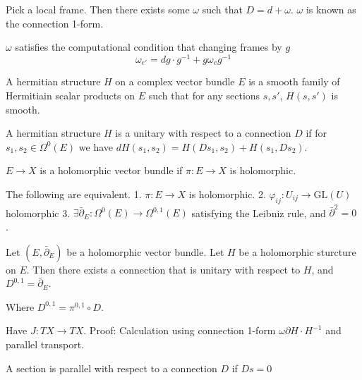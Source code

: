 Pick a local frame. 
Then there exists some $\omega$ such that $ D = d + \omega $. 
$\omega $ is known as the connection 1-form. 

$\omega $ satisfies the computational condition that changing frames by $g$ 
\begin{equation}
    \omega _ {e'} = dg \cdot g^{-1} + g \omega_e g^{-1} 
\end{equation}

\begin{definition}
A hermitian structure $H$ on a complex vector bundle $ E$ is a smooth family of 
    Hermitiain scalar products on $E$ such that for any sections $ s, s'$, $ H(s,s') $ is smooth. 
\end{definition}

\begin{definition}
    A hermitian structure $H$ is a unitary with respect to a connection $D$ if 
    for $ s_1, s_2 \in \Omega^0 (E) $ we have $ dH(s_1, s_2 ) = H(Ds_1, s_2) + H(s_1, Ds_2)$.
\end{definition}

\begin{definition}
    $E \rightarrow  X$ is a holomorphic vector bundle if $ \pi: E \rightarrow X $ is holomorphic. 
\end{definition}

\begin{proposition}
The following are equivalent. 
    1. $ \pi : E \rightarrow X $ is holomorphic.
    2. $ \varphi_{ij} : U_{ij} \rightarrow \mathrm{GL}(U) $ holomorphic
    3. $ \exists \bar{\partial} _E : \Omega ^0 ( E) \rightarrow \Omega ^{0,1} ( E) $ 
    satisfying the Leibniz rule, and $ \bar{\partial} ^2  = 0 $ .
\end{proposition}

\begin{theorem}
    Let $ (E, \bar{\partial}_E ) $ be a holomorphic vector bundle. 
    Let $H$ be a holomorphic sturcture on $E$. 
    Then there exists a connection that is unitary with respect to $H$, 
    and $D^{0,1} = \bar{\partial}_E$.
\end{theorem}

Where $ D^{0,1} = \pi^{0,1} \circ D$.

Have $ J : TX \rightarrow TX $. 
Proof: 
Calculation using connection 1-form $ \omega \partial H \cdot H^{-1}$
and parallel transport. 

\begin{definition}
A section is parallel with respect to a connection $ D$ if $Ds = 0 $
\end{definition}

